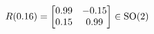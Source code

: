 \documentclass[preview]{standalone}
\begin{document}
\begin{align*}
\special{dvisvgm:raw <g id='unique000'>}R(0.16) = \begin{bmatrix} 0.99 & -0.15 \\ 0.15 & 0.99 \end{bmatrix} \in \text{SO}(2)\special{dvisvgm:raw </g>}
\end{align*}
\end{document}
